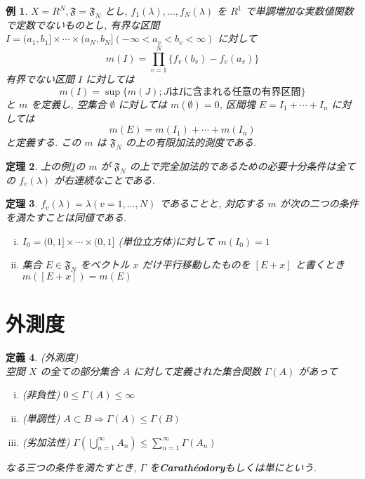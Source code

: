 \documentclass[dvipdfmx]{jsreport}
\newtheorem{theo}{定理}[section]
\newtheorem{defi}[theo]{定義}
\newtheorem{exam}[theo]{例}
\begin{document}
\begin{exam} \label{finitely_additive_measure_example}
    $X = R^N, \mathfrak{F} = \mathfrak{F}_N$ とし, $f_1(\lambda), \dots, f_N(\lambda)$ を $R^1$ で単調増加な実数値関数で定数でないものとし, 有界な区間 $I = (a_1, b_1] \times \cdots \times (a_N, b_N] (-\infty < a_v < b_v < \infty)$ に対して
    \begin{equation}
        m(I) = \prod_{v = 1}^N \{f_v(b_v) - f_v(a_v)\}
    \end{equation}
    有界でない区間 $I$ に対しては
    \begin{equation}
        m(I) = \sup\{m(J) ; J は I に含まれる任意の有界区間\}
    \end{equation}
    と $m$ を定義し, 空集合 $\emptyset$ に対しては $m(\emptyset) = 0$, 区間塊 $E = I_1 + \cdots + I_n$ に対しては
    \begin{equation}
        m(E) = m(I_1) + \cdots + m(I_n)
    \end{equation}
    と定義する. この $m$ は $\mathfrak{F}_N$ の上の有限加法的測度である. 
\end{exam}

\begin{theo}
    上の例\ref{finitely_additive_measure_example}の $m$ が $\mathfrak{F}_N$ の上で完全加法的であるための必要十分条件は全ての $f_v(\lambda)$ が右連続なことである. 
\end{theo}

\begin{theo}
    $f_v(\lambda) = \lambda (v = 1, \dots, N)$ であることと, 対応する $m$ が次の二つの条件を満たすことは同値である. 
    \begin{enumerate}[(i)]
        \item $I_0 = (0, 1] \times \cdots \times (0, 1]$ (単位立方体)に対して $m(I_0) = 1$
        \item 集合 $E \in \mathfrak{F}_N$ をベクトル $x$ だけ平行移動したものを $[E + x]$ と書くとき $m([E + x]) = m(E)$
    \end{enumerate}
\end{theo}

\section{外測度}

\begin{defi}
    (外測度) \\
    空間 $X$ の全ての部分集合 $A$ に対して定義された集合関数 $\Gamma(A)$ があって
    \begin{enumerate}[(i)]
        \item (非負性) $0 \leq \Gamma(A) \leq \infty$
        \item (単調性) $A \subset B \Rightarrow \Gamma(A) \leq \Gamma(B)$
        \item (劣加法性) $\displaystyle \Gamma\left( \bigcup_{n = 1}^\infty A_n \right) \leq \sum_{n = 1}^\infty \Gamma(A_n)$
    \end{enumerate}
    なる三つの条件を満たすとき,  $\Gamma$ を{\bf Carathéodory}もしくは単にという. 
\end{defi}
\end{document}
